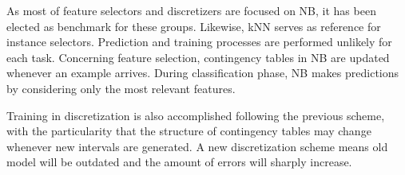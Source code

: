 \documentclass[preprint,12pt]{elsarticle}
\begin{document}
\begin{table}[!htp]
\renewcommand{\arraystretch}{1.3}
\centering
\scriptsize
\caption{Parameters of methods}
\label{tab:parameters}
\end{table}

As most of feature selectors and discretizers are focused on NB, it has been elected as benchmark for these groups. Likewise, kNN serves as reference for instance selectors. Prediction and training processes are performed unlikely for each task. Concerning feature selection, contingency tables in NB are updated whenever an example arrives. During classification phase, NB makes predictions by considering only the most relevant features. 

Training in discretization is also accomplished following the previous scheme, with the particularity that the structure of contingency tables may change whenever new intervals are generated. A new discretization scheme means old model will be outdated and the amount of errors will sharply increase. %
\end{document}

